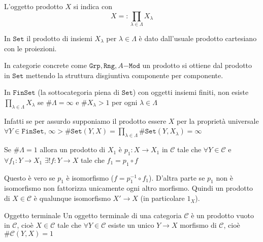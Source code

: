 \begin{note}[zione]
    L'oggetto prodotto \(X\) si indica con
    \[
      X =: \prod_{\lambda \in \Lambda} X_\lambda
    \]
\end{note}

\begin{example}{}
    In \(\mathtt{Set}\) il prodotto di insiemi \(X_\lambda\) per \(\lambda \in \Lambda\) 
    è dato dall'usuale prodotto cartesiano con le proiezioni.

    In categorie concrete come \(\mathtt{Grp}, \mathtt{Rng}, A\mathtt{-Mod}\) un
    prodotto si ottiene dal prodotto in \(\mathtt{Set}\) mettendo la struttura
    disgiuntiva componente per componente.
\end{example}

\begin{example}{}
    In \(\mathtt{FinSet}\) (la sottocategoria piena di \(\mathtt{Set}\)) con
    oggetti insiemi finiti, non esiste \(\prod_{\lambda \in \Lambda} X_\lambda\) se \(\# \Lambda = \infty\) e \(\# X_\lambda > 1\) per ogni \(\lambda \in \Lambda\) 

    Infatti se per assurdo supponiamo il prodotto essere \(X\) per la proprietà
    universale \(\forall Y \in \mathtt{FinSet}\), \( \infty > 
    \# \mathtt{Set}{(Y, X)} = \prod_{\lambda \in \Lambda} \# \mathtt{Set}(Y,
    X_\lambda) = \infty\) 
\end{example}

\begin{remark}{}
    Se \(\# \Lambda = 1\) allora un prodotto di \(X_1\) è \(p_1 : X \to X_{1}\)
    in \(\mathcal{\mathcal{C}}\) tale che \(\forall Y \in \mathcal{\mathcal{C}}\) e \(\forall f_{1} : Y \to X_{1}\) 
    \(\exists ! f : Y \to X\) tale che \(f_{1} = p_{1} \circ f\) 

    Questo è vero se \(p_{1}\) è isomorfismo (\(f = p_{1}^{-1} \circ f_{1}\)).
    D'altra parte se \(p_{1}\) non è isomorfismo non fattorizza unicamente ogni
    altro morfismo. Quindi un prodotto di \(
    X \in \mathcal{\mathcal{C}}\) è qualunque isomorfismo \(X' \to X\) (in particolare \(1_X\)).
\end{remark}

\begin{definition}{Oggetto terminale}
    Un oggetto terminale di una categoria \(\mathcal{\mathcal{C}}\) è un prodotto vuoto in
    \(\mathcal{\mathcal{C}}\), cioè \(X \in \mathcal{\mathcal{C}}\) tale che \(\forall Y \in \mathcal{\mathcal{C}}\) esiste un unico \(Y \to X\) morfismo di \(\mathcal{C}\), cioè \(\#\mathcal{\mathcal{C}}{(Y, X)} = 1\) 
\end{definition}

